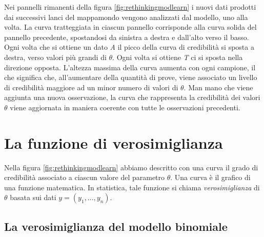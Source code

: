 \documentclass[
]{memoir}
\theoremstyle{definition}
\theoremstyle{definition}
\theoremstyle{definition}
\theoremstyle{definition}
\theoremstyle{remark}
\begin{document}
Nei pannelli rimanenti della figura \ref{fig:rethinkingmodlearn} i nuovi dati prodotti dai successivi lanci del mappamondo vengono analizzati dal modello, uno alla volta. La curva tratteggiata in ciascun pannello corrisponde alla curva solida del pannello precedente, spostandosi da sinistra a destra e dall'alto verso il basso. Ogni volta che si ottiene un dato \emph{A} il picco della curva di credibilità si sposta a destra, verso valori più grandi di \(\theta\). Ogni volta si ottiene \emph{T} ci si sposta nella direzione opposta. L'altezza massima della curva aumenta con ogni campione, il che significa che, all'aumentare della quantità di prove, viene associato un livello di credibilità maggiore ad un minor numero di valori di \(\theta\). Man mano che viene aggiunta una nuova osservazione, la curva che rappresenta la credibilità dei valori \(\theta\) viene aggiornata in maniera coerente con tutte le osservazioni precedenti.

\hypertarget{la-funzione-di-verosimiglianza-1}{%
\section{La funzione di verosimiglianza}\label{la-funzione-di-verosimiglianza-1}}

Nella figura \ref{fig:rethinkingmodlearn} abbiamo descritto con una curva il grado di credibilità associato a ciascun valore del parametro \(\theta\). Una curva è il grafico di una funzione matematica. In statistica, tale funzione si chiama \emph{verosimiglianza} di \(\theta\) basata sui dati \(y = (y_1, \dots, y_n)\).

\hypertarget{la-verosimiglianza-del-modello-binomiale}{%
\subsection{La verosimiglianza del modello binomiale}\label{la-verosimiglianza-del-modello-binomiale}}
\end{document}
